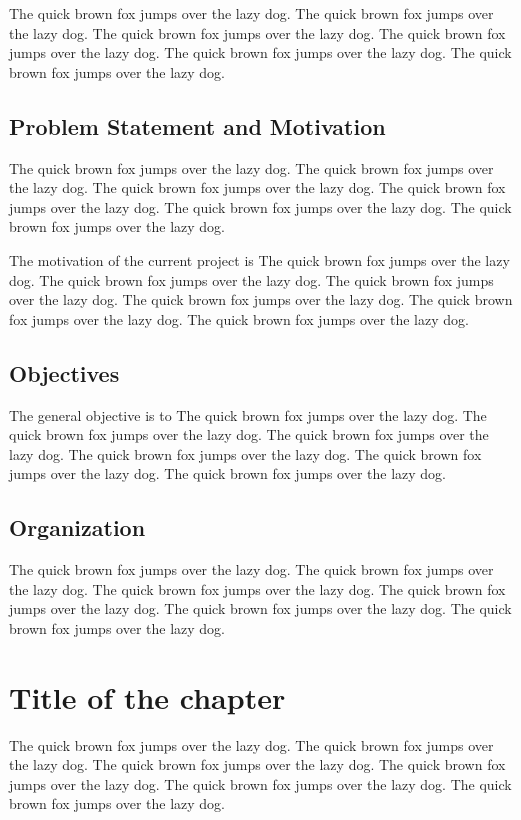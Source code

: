 \documentclass[11pt,a4paper]{report}
\begin{document}
The quick brown fox jumps over the lazy dog. The quick brown fox jumps over the lazy dog. The quick brown fox jumps over the lazy dog. The quick brown fox jumps over the lazy dog. The quick brown fox jumps over the lazy dog. The quick brown fox jumps over the lazy dog. 

\section{Problem Statement and Motivation}
\label{sec:motivation}
The quick brown fox jumps over the lazy dog. The quick brown fox jumps over the lazy dog. The quick brown fox jumps over the lazy dog. The quick brown fox jumps over the lazy dog. The quick brown fox jumps over the lazy dog. The quick brown fox jumps over the lazy dog. 

The motivation of the current project is
The quick brown fox jumps over the lazy dog. The quick brown fox jumps over the lazy dog. The quick brown fox jumps over the lazy dog. The quick brown fox jumps over the lazy dog. The quick brown fox jumps over the lazy dog. The quick brown fox jumps over the lazy dog. 

\section{Objectives}
\label{sec:name}
The general objective is to
The quick brown fox jumps over the lazy dog. The quick brown fox jumps over the lazy dog. The quick brown fox jumps over the lazy dog. The quick brown fox jumps over the lazy dog. The quick brown fox jumps over the lazy dog. The quick brown fox jumps over the lazy dog. 

\section{Organization}
\label{sec:org}
The quick brown fox jumps over the lazy dog. The quick brown fox jumps over the lazy dog. The quick brown fox jumps over the lazy dog. The quick brown fox jumps over the lazy dog. The quick brown fox jumps over the lazy dog. The quick brown fox jumps over the lazy dog. 

\chapter{Title of the chapter}
\label{cap:name1}

The quick brown fox jumps over the lazy dog. The quick brown fox jumps over the lazy dog. The quick brown fox jumps over the lazy dog. The quick brown fox jumps over the lazy dog. The quick brown fox jumps over the lazy dog. The quick brown fox jumps over the lazy dog. 
\end{document}
